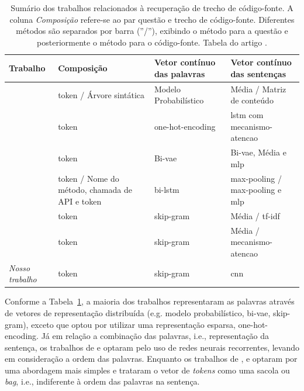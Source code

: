\begin{table}[H]
\centering

\begin{tabular}{ l p{3cm} p{3cm} p{3cm} }
 \hline
 \textbf{Trabalho} & \textbf{Composição} & \textbf{Vetor contínuo das palavras} & \textbf{Vetor contínuo das sentenças} \\
 \hline
\citep{Allamanis-bimodal-source-code-natural-language:2015} & \Gls{token} / Árvore sintática & Modelo Probabilístico & Média / Matriz de conteúdo  \\

\citep{iyer-etal-2016-summarizing} & \Gls{token} & \Gls{one-hot-encoding} & \acrshort{lstm} com \gls{mecanismo-atencao}  \\

\citep{Chen-bi-variational-autoencoder:2018} & \Gls{token} & Bi-\acrshort{vae} & Bi-\acrshort{vae}, Média e \acrshort{mlp}  \\

\citep{Gu-deep-code-search:2018} & \Gls{token} / Nome do método, chamada de API e \Gls{token} & bi-\acrshort{lstm} & \Gls{max-pooling} / \Gls{max-pooling} e \acrshort{mlp}   \\

\citep{Sachdev-neural-code-search:2018} & \Gls{token} & \Gls{skip-gram} & Média / \acrshort{tf-idf}   \\

\citep{cambronero-deep-learning-code-search:2019} & \Gls{token} & \Gls{skip-gram} & Média / \Gls{mecanismo-atencao}   \\

\textit{Nosso trabalho} & \Gls{token} & \Gls{skip-gram} & \acrshort{cnn}   \\

 \hline
\end{tabular}
\caption[Sumário dos trabalhos relacionados à recuperação de trecho de código-fonte.]{Sumário dos trabalhos relacionados à recuperação de trecho de código-fonte. A coluna \emph{Composição} refere-se ao par questão e trecho de código-fonte. Diferentes métodos são separados por barra (''/''), exibindo o método para a questão e posteriormente o método para o código-fonte. Tabela do artigo \cite{martins2020concra}.}
\label{table:summary-joint-embedding}
\end{table}

Conforme a Tabela~\ref{table:summary-joint-embedding}, a maioria dos trabalhos representaram as palavras através de vetores de representação distribuída (e.g. modelo probabilístico, bi-\acrshort{vae}, \gls{skip-gram}), exceto \cite{iyer-etal-2016-summarizing} que optou por utilizar uma representação esparsa, \gls{one-hot-encoding}. Já em relação a combinação das palavras, i.e., representação da sentença, os trabalhos de \cite{Gu-deep-code-search:2018} e \cite{iyer-etal-2016-summarizing} optaram pelo uso de redes neurais recorrentes, levando em consideração a ordem das palavras. Enquanto os trabalhos de \cite{Chen-bi-variational-autoencoder:2018}, \cite{Sachdev-neural-code-search:2018} e \cite{cambronero-deep-learning-code-search:2019} optaram por uma abordagem mais simples e trataram o vetor de \textit{tokens} como uma sacola ou \textit{bag}, i.e., indiferente à ordem das palavras na sentença.


